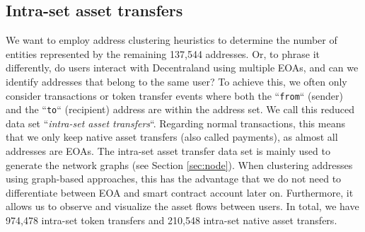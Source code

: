 \documentclass[12pt,a4paper,titlepage,oneside,english]{article}
\begin{document}
\subsection{Intra-set asset transfers}
\label{sec:intra-set}
We want to employ address clustering heuristics to determine the number of entities represented by the remaining 137,544 addresses. Or, to phrase it differently, do users interact with Decentraland using multiple EOAs, and can we identify addresses that belong to the same user?
\newline
To achieve this, we often only consider transactions or token transfer events where both the ``\texttt{from}`` (sender) and the ``\texttt{to}`` (recipient) address are within the address set. We call this reduced data set ``\textit{intra-set asset transfers}``. Regarding normal transactions, this means that we only keep native asset transfers (also called payments), as almost all addresses are EOAs. \newline
The intra-set asset transfer data set is mainly used to generate the network graphs (see Section \ref{sec:node}).
When clustering addresses using graph-based approaches, this has the advantage that we do not need to differentiate between EOA and smart contract account later on. Furthermore, it allows us to observe and visualize the asset flows between users. In total, we have 974,478 intra-set token transfers and 210,548 intra-set native asset transfers. 

\end{document}
